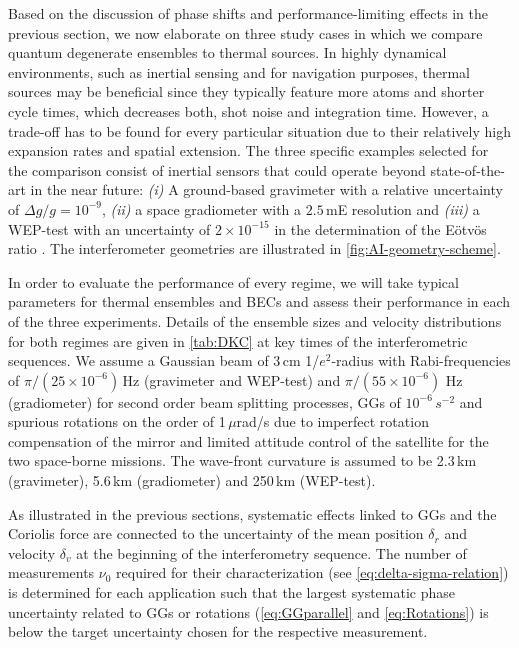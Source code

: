 %
%
Based on the discussion of phase shifts and performance-limiting effects in the previous section, we now elaborate on three study cases in which we compare quantum degenerate ensembles to thermal sources.
In highly dynamical environments, such as inertial sensing and for navigation purposes, thermal sources may be beneficial since they typically feature more atoms and shorter cycle times, which decreases both, shot noise and integration time. However, a trade-off has to be found for every particular situation due to their relatively high expansion rates and spatial extension.
The three specific examples selected for the comparison consist of inertial sensors that could operate beyond state-of-the-art in the near future: \emph{(i)} A ground-based gravimeter with a relative uncertainty of $\Delta g/g=10^{-9}$, \emph{(ii)} a space gradiometer with a $2.5$\,mE resolution \cite{Trimeche2019} and \emph{(iii)} a WEP-test with an uncertainty of $2\times10^{-15}$ in the determination of the Eötvös ratio \cite{Aguilera2014}. The interferometer geometries are illustrated in \autoref{fig:AI-geometry-scheme}.

In order to evaluate the performance of every regime, we will take typical parameters for thermal ensembles and BECs and assess their performance in each of the three experiments. Details of the ensemble sizes and velocity distributions for both regimes are given in \autoref{tab:DKC} at key times of the interferometric sequences.
We assume a Gaussian beam of 3\,cm 1/$e^2$-radius with Rabi-frequencies of $\pi/(25\times 10^{-6})$\,Hz (gravimeter and WEP-test) and $\pi/(55\times 10^{-6})$ Hz (gradiometer) for second order beam splitting processes, GGs of $10^{-6}$\,$s^{-2}$ and spurious rotations on the order of 1\,$\mu$rad/s due to imperfect rotation compensation of the mirror and limited attitude control of the satellite for the two space-borne missions. The wave-front curvature is assumed to be 2.3\,km (gravimeter), 5.6\,km (gradiometer) and 250\,km (WEP-test). 

As illustrated in the previous sections, systematic effects linked to GGs and the Coriolis force are connected to the uncertainty of the mean position $\delta_r$ and velocity $\delta_v$ at the beginning of the interferometry sequence. The number of measurements $\nu_0$ required for their characterization (see \autoref{eq:delta-sigma-relation}) is determined for each application such that the largest systematic phase uncertainty related to GGs or rotations (\autoref{eq:GGparallel} and \autoref{eq:Rotations}) is below the target uncertainty chosen for the respective measurement.

